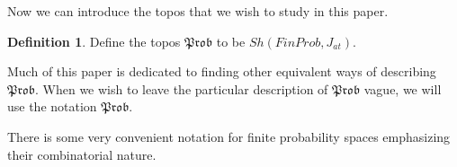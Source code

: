 \documentclass[a4paper]{amsproc}
\theoremstyle{plain}
\theoremstyle{definition}
\newtheorem{definition}[theorem]{Definition}
\theoremstyle{remark}
\numberwithin{equation}{section}
\begin{document}
Now we can introduce the topos that we wish to study in this paper.

\begin{definition}
Define the topos $\mathfrak{Prob}$ to be $Sh(FinProb, J_{at})$.
\end{definition}

Much of this paper is dedicated to finding other equivalent ways of describing $\mathfrak{Prob}$. When we wish to leave the particular description of $\mathfrak{Prob}$ vague, we will use the notation $\mathfrak{Prob}$.

There is some very convenient notation for finite probability spaces emphasizing their combinatorial nature.
\end{document}
